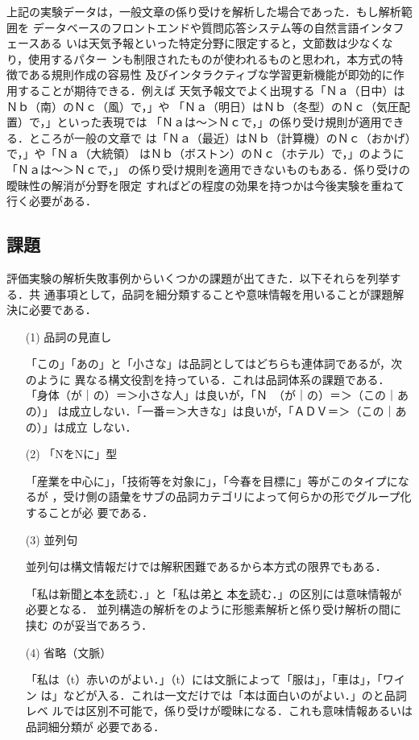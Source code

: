 上記の実験データは，一般文章の係り受けを解析した場合であった．もし解析範囲を
データベースのフロントエンドや質問応答システム等の自然言語インタフェースある
いは天気予報といった特定分野に限定すると，文節数は少なくなり，使用するパター
ンも制限されたものが使われるものと思われ，本方式の特徴である規則作成の容易性
及びインタラクティブな学習更新機能が即効的に作用することが期待できる．例えば
天気予報文でよく出現する「Ｎａ（日中）はＮｂ（南）のＮｃ（風）で，」や
「Ｎａ（明日）はＮｂ（冬型）のＮｃ（気圧配置）で，」といった表現では
「Ｎａは〜＞Ｎｃで，」の係り受け規則が適用できる．ところが一般の文章で
は「Ｎａ（最近）はＮｂ（計算機）のＮｃ（おかげ）で，」や「Ｎａ（大統領）
はＮｂ（ボストン）のＮｃ（ホテル）で，」のように「Ｎａは〜＞Ｎｃで，」
の係り受け規則を適用できないものもある．係り受けの曖昧性の解消が分野を限定
すればどの程度の効果を持つかは今後実験を重ねて行く必要がある．

\subsection{課題}

評価実験の解析失敗事例からいくつかの課題が出てきた．以下それらを列挙する．共
通事項として，品詞を細分類することや意味情報を用いることが課題解決に必要である．

\begin{itemize}
\item[(1)] 品詞の見直し

「この」「あの」と「小さな」は品詞としてはどちらも連体詞であるが，次のように
異なる構文役割を持っている．これは品詞体系の課題である．
「身体（が｜の）＝＞小さな人」は良いが，「Ｎ　（が｜の）＝＞（この｜あの）」
は成立しない．「一番＝＞大きな」は良いが，「ＡＤＶ＝＞（この｜あの）」は成立
しない．

\item[(2)] 「NをNに」型

「産業を中心に」，「技術等を対象に」，「今春を目標に」等がこのタイプになるが
，受け側の語彙をサブの品詞カテゴリによって何らかの形でグループ化することが必
要である．

\item[(3)] 並列句

並列句は構文情報だけでは解釈困難であるから本方式の限界でもある．

\hspace*{-1mm}「私は新聞\underline{と}本\underline{を}読む．」\hspace*{-2mm}と\hspace*{-1mm}「私は弟\underline{と}
本\underline{を}読む．」\hspace*{-2mm}の区別には意味情報が必要となる．
並列構造の解析を\cite{nagao1994}のように形態素解析と係り受け解析の間に挟む
のが妥当であろう．

\item[(4)] 省略（文脈）

「私は（t）赤いのがよい．」（t）には文脈によって「服は」，「車は」，「ワイン
は」などが入る．これは一文だけでは「本は面白いのがよい．」のと品詞レベ
ルでは区別不可能で，係り受けが曖昧になる．これも意味情報あるいは品詞細分類が
必要である．
\end{itemize}

